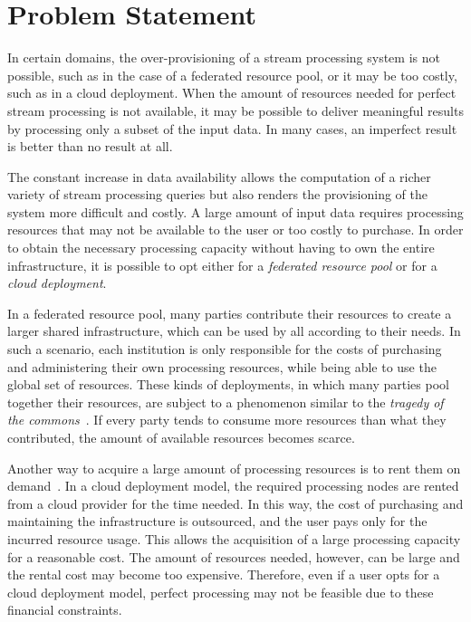 \section{Problem Statement}

In certain domains, the over-provisioning of a stream processing system is not possible, such as
in the case of a federated resource pool, or it may be too costly, such as in a cloud deployment.
When the amount of resources needed for perfect stream processing is not available, 
it may be possible to deliver meaningful results by processing only a subset of
the input data.
In many cases, an imperfect result is better than no result at all. 


The constant increase in data availability allows the computation of a richer variety of stream
processing queries but also renders the provisioning of the system more difficult and costly.
A large amount of input data requires processing resources that may not be available to the user or
too costly to purchase.
In order to obtain the necessary processing capacity without having to own the entire infrastructure, it
is possible to opt either for a \emph{federated resource pool} or for a \emph{cloud deployment}.

In a federated resource pool, many parties contribute their resources to create	 a larger shared
infrastructure, which can be used by all according to their needs. In such a scenario, each institution
is only responsible for the costs of purchasing and administering their own processing resources, while
being able to use the global set of resources. 
These kinds of deployments, in which many parties pool together their resources, are subject to a
phenomenon similar to the \emph{tragedy of the commons}~\cite{Hardin68}. If every party tends to
consume more resources than what they contributed, the amount of available resources becomes scarce.

Another way to acquire a large amount of processing resources is to rent them on demand~\cite{cloud}. 
In a cloud deployment model, the required processing nodes are rented from a cloud
provider for the time needed. In this way, the cost of purchasing and maintaining the infrastructure
is outsourced, and the user pays only for the incurred resource usage. 
This allows the acquisition of a large processing capacity for a reasonable cost.
The amount of resources needed, however, can be large and the rental cost may become too expensive. 
Therefore, even if a user opts for a cloud deployment model, perfect
processing may not be feasible due to these financial constraints.

